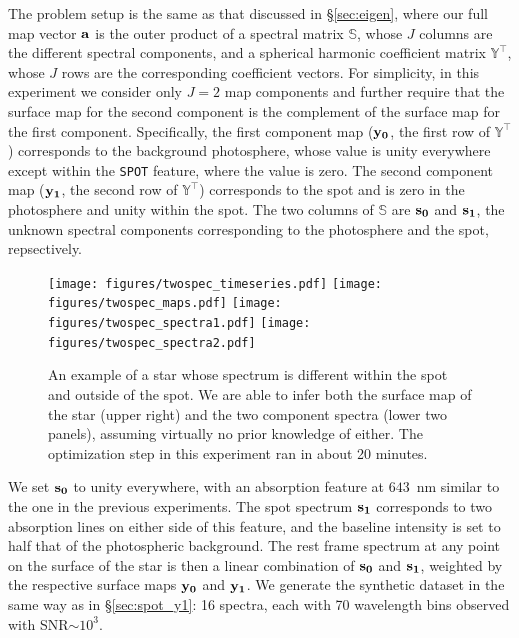 \documentclass[modern]{aastex631}
\def\timeInferTwoSpec{about 20 minutes}
\begin{document}
The problem setup is the same as that discussed in \S\ref{sec:eigen}, where our full map vector ${\mathbf{a}}$ is the outer product of a spectral matrix $\mathbb{S}$, whose $J$ columns are the different spectral components, and a spherical harmonic coefficient matrix $\mathbb{Y}^\top$, whose $J$ rows are the corresponding coefficient vectors. 
For simplicity, in this experiment we consider only $J = 2$ map components and further require that the surface map for the second component is the complement of the surface map for the first component. Specifically, the first component map (${\mathbf{y_0}}$, the first row of $\mathbb{Y}^\top$) corresponds to the background photosphere, whose value is unity everywhere except within the \texttt{SPOT} feature, where the value is zero. The second component map (${\mathbf{y_1}}$, the second row of $\mathbb{Y}^\top$) corresponds to the spot and is zero in the photosphere and unity within the spot.
The two columns of $\mathbb{S}$ are ${\mathbf{s_0}}$ and ${\mathbf{s_1}}$, the unknown spectral components corresponding to the photosphere and the spot, repsectively.
%
\begin{figure}[p!]
    \begin{centering}
        \texttt{[image: figures/twospec\_timeseries.pdf]}
        \texttt{[image: figures/twospec\_maps.pdf]}
        \texttt{[image: figures/twospec\_spectra1.pdf]}
        \texttt{[image: figures/twospec\_spectra2.pdf]}
        \caption{%
            An example of a star whose spectrum is different within the spot and outside of the spot.
            We are able to infer both the surface map of the star (upper right) and the two component spectra (lower two panels), assuming virtually no prior knowledge of either.
            The optimization step in this experiment ran in \timeInferTwoSpec.
        }
        \label{fig:twospec}
    \end{centering}
\end{figure}
%
We set ${\mathbf{s_0}}$ to unity everywhere, with an absorption feature at $643$~nm similar to the one in the previous experiments. The spot spectrum ${\mathbf{s_1}}$ corresponds to two absorption lines on either side of this feature, and the baseline intensity is set to half that of the photospheric background.
%
The rest frame spectrum at any point on the surface of the star is then a linear combination of ${\mathbf{s_0}}$ and ${\mathbf{s_1}}$, weighted by the respective surface maps ${\mathbf{y_0}}$ and ${\mathbf{y_1}}$.
%
We generate the synthetic dataset in the same way as in \S\ref{sec:spot_y1}: 16 spectra, each with 70 wavelength bins observed with SNR$\sim 10^{3}$.
\end{document}
